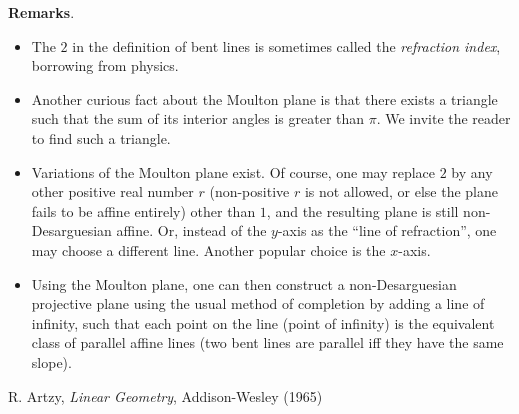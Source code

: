\documentclass[12pt]{article}
\begin{document}
\textbf{Remarks}.  
\begin{itemize}
\item The $2$ in the definition of bent lines is sometimes called the \emph{refraction index}, borrowing from physics.
\item Another curious fact about the Moulton plane is that there exists a triangle such that the sum of its interior angles is greater than $\pi$.  We invite the reader to find such a triangle.
\item Variations of the Moulton plane exist.  Of course, one may replace $2$ by any other positive real number $r$ (non-positive $r$ is not allowed, or else the plane fails to be affine entirely) other than $1$, and the resulting plane is still non-Desarguesian affine.  Or, instead of the $y$-axis as the ``line of refraction'', one may choose a different line.  Another popular choice is the $x$-axis.
\item Using the Moulton plane, one can then construct a non-Desarguesian projective plane using the usual method of completion by adding a line of infinity, such that each point on the line (point of infinity) is the equivalent class of parallel affine lines (two bent lines are parallel iff they have the same slope).
\end{itemize}

\begin{thebibliography}{7}
 R. Artzy, {\it Linear Geometry}, Addison-Wesley (1965)
\end{thebibliography}
\end{document}
